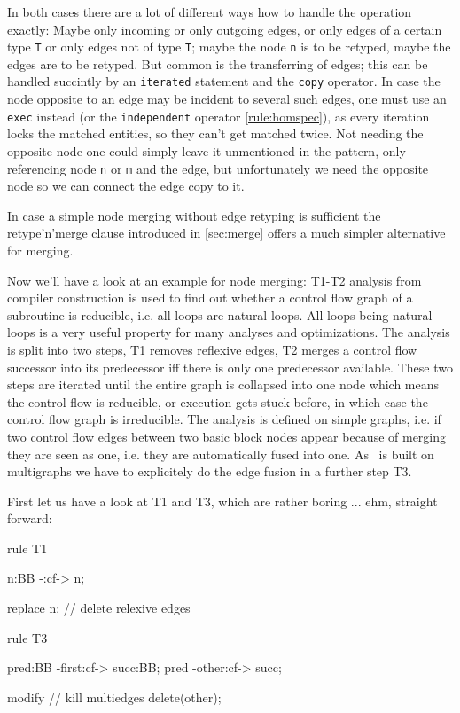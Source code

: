 In both cases there are a lot of different ways how to handle the operation exactly:
Maybe only incoming or only outgoing edges, or only edges of a certain type \texttt{T} or only edges not of type \texttt{T}; maybe the node \texttt{n} is to be retyped, maybe the edges are to be retyped.
But common is the transferring of edges; this can be handled succintly by an \texttt{iterated} statement and the \texttt{copy} operator.
In case the node opposite to an edge may be incident to several such edges, one must use an \texttt{exec} instead (or the \texttt{independent} operator \ref{rule:homspec}), as every iteration locks the matched entities, so they can't get matched twice. Not needing the opposite node one could simply leave it unmentioned in the pattern, only referencing node \texttt{n} or \texttt{m} and the edge, but unfortunately we need the opposite node so we can connect the edge copy to it.

\begin{note}
In case a simple node merging without edge retyping is sufficient the retype'n'merge clause introduced in \ref{sec:merge} offers a much simpler alternative for merging.
\end{note}

Now we'll have a look at an example for node merging: T1-T2 analysis from compiler construction is used to find out whether a control flow graph of a subroutine is reducible, i.e. all loops are natural loops. All loops being natural loops is a very useful property for many analyses and optimizations. The analysis is split into two steps, T1 removes reflexive edges, T2 merges a control flow successor into its predecessor iff there is only one predecessor available. These two steps are iterated until the entire graph is collapsed into one node which means the control flow is reducible, or execution gets stuck before, in which case the control flow graph is irreducible.
The analysis is defined on simple graphs, i.e. if two control flow edges between two basic block nodes appear because of merging they are seen as one, i.e. they are automatically fused into one. As \GrG~is built on multigraphs we have to explicitely do the edge fusion in a further step T3.

First let us have a look at T1 and T3, which are rather boring ... ehm, straight forward:

  \begin{example}
    \begin{grgen}
rule T1
{
  n:BB -:cf-> n;

  replace {
    n; // delete relexive edges
  }
}

rule T3
{
  pred:BB -first:cf-> succ:BB;
  pred    -other:cf-> succ;

  modify { // kill multiedges
    delete(other);
  }
}
    \end{grgen}
  \end{example}

